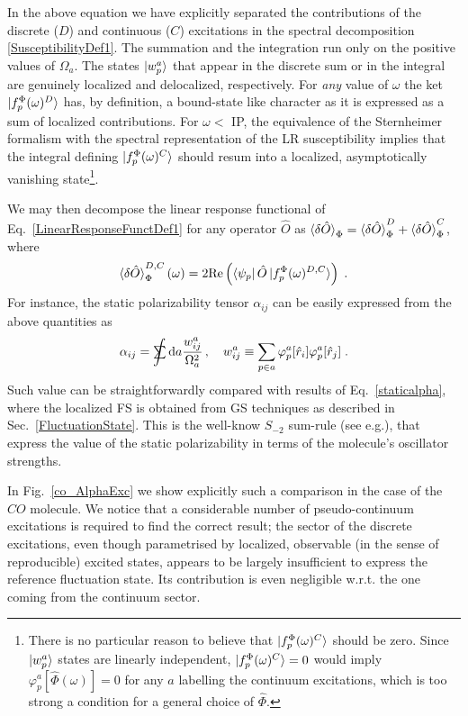 \documentclass[reprint,aps,prb]{revtex4-1}
\newcommand{\dd}{{\rm d}}
\newcommand{\sint}{\mathrlap{\displaystyle\int}
\mathrlap{\textstyle\sum}
\phantom{\mathrlap{\displaystyle
\int}\textstyle\sum}}
\newcommand{\be}{\begin{equation}}
\newcommand{\ee}{\end{equation}}
\newcommand{\lb}{\label}
\newcommand{\op}[1]{\hat {#1}}
\newcommand{\fscd}[1]{\ket{f_p^\Phi(\omega)^{#1}}}
\begin{document}
In the above equation we have explicitly separated the contributions of the discrete ($D$) and continuous ($C$) excitations
in the spectral decomposition \eqref{SusceptibilityDef1}.
The summation and the integration run only on the positive values of $\Omega_a$.
The states $\ket{w_p^a}$ that appear in the discrete sum
or in the integral are genuinely localized and delocalized, respectively.
For \emph{any} value of $\omega$ the ket $\fscd{D}$ has, by definition, a bound-state like
character as it is expressed as a sum of localized contributions.
For $\omega <$ IP, the equivalence of the Sternheimer formalism with the spectral representation of the LR susceptibility implies that the integral defining
$\fscd{C}$ should resum into a localized, asymptotically vanishing state\footnote{There is no particular reason to believe that $\fscd{C}$ should be
zero. Since $\ket{w_p^a}$ states are linearly independent,
$\fscd{C}=0$ would imply
$\varphi_p^a[\op \Phi(\omega)]=0$ for any $a$ labelling the continuum excitations,
which is too strong a condition for a general choice of $\op \Phi$.}.

We may then decompose the linear response functional of Eq.~\eqref{LinearResponseFunctDef1}
for any operator $\op O$ as $\braket{\delta\op O}_\Phi=\braket{\delta\op O}^D_\Phi +
\braket{\delta\op O}^C_\Phi$, where
\be
\braket{\delta\op O}^{D,C}_\Phi(\omega) =
2 \mathrm{Re}\left(\bra{\psi_p} \op O \fscd{D,C} \right)\;.
\ee
For instance, the static polarizability tensor $\alpha_{ij}$ can be easily expressed
from the above quantities as
\be\lb{sminus2}
\alpha_{ij} = \sint \dd a \frac{w^a_{ij}}{\Omega_a^2}\,, \quad w^a_{ij} \equiv \sum_{p\in a} \varphi_p^a[\op r_i]\varphi_p^a[\op r_j]\;.
\ee
Such value can be straightforwardly compared with results of Eq.~\eqref{staticalpha}, where the localized FS is obtained from GS techniques as
described in Sec.~\ref{FluctuationState}.
This is the well-know $S_{-2}$ sum-rule (see e.g.\cite{Wagner2012}), that express the value of the static polarizability
in terms of the molecule's oscillator strengths.

In Fig.~\ref{co_AlphaExc} we show explicitly such a comparison in the case of the $CO$ molecule.
We notice that a considerable number of pseudo-continuum excitations is required
to find the correct result; the sector of the discrete excitations, even though
parametrised by localized, observable (in the sense of reproducible) excited states,
appears to be largely insufficient to express the reference fluctuation state. Its contribution is even negligible w.r.t.
the one coming from the continuum sector.
\end{document}
